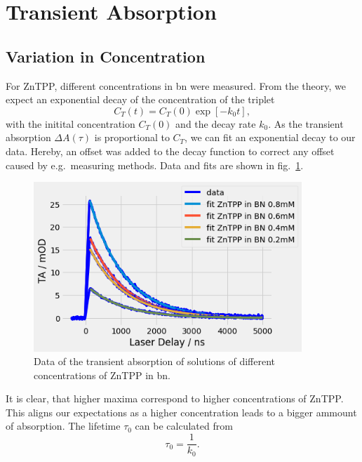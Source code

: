 \section{Transient Absorption}
\label{sec:TRAS}


\subsection*{Variation in Concentration}
For ZnTPP, different concentrations in bn were measured. From the theory, we expect an exponential decay of the concentration of the triplet 
\begin{equation}
    C_T(t) = C_T(0) \exp[-k_0t],
\end{equation}
with the initital concentration $C_T(0)$ and the decay rate $k_0$.
As the transient absorption $\Delta A(\tau)$ is proportional to $C_T$, we can fit an exponential decay to our data. Hereby, an offset was added to the decay function to correct any offset caused by e.g.~measuring methods. Data and fits are shown in fig.~\ref{fig:TRAS-Conc}.

\begin{figure}[h]
    \centering
    \includegraphics[width = 0.9\textwidth]{Bilder/Auswertung/TRAS/ZnTPPdiffConc.png}
    \caption{Data of the transient absorption of solutions of different concentrations of ZnTPP in bn.}
    \label{fig:TRAS-Conc}
\end{figure}

It is clear, that higher maxima correspond to higher concentrations of ZnTPP. This aligns our expectations as a higher concentration leads to a bigger ammount of absorption. The lifetime $\tau_0$ can be calculated from 
\begin{equation}
    \tau_0 = \frac{1}{k_0}.
\end{equation}

